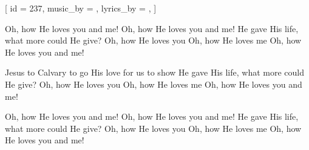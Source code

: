 
[
    id                  = {237},
    music_by            = {},
    lyrics_by           = {},
]


\beginverse

Oh, how He loves you and me!
Oh, how He loves you and me!
He gave His life, what more could He give?
Oh, how He loves you
Oh, how He loves me
Oh, how He loves you and me!

\endverse


\beginchorus

Jesus to Calvary to go
His love for us to show
He gave His life, what more could He give?
Oh, how He loves you
Oh, how He loves me
Oh, how He loves you and me!

\endchorus


\beginverse

Oh, how He loves you and me!
Oh, how He loves you and me!
He gave His life, what more could He give?
Oh, how He loves you
Oh, how He loves me
Oh, how He loves you and me!

\endverse


\endsong
